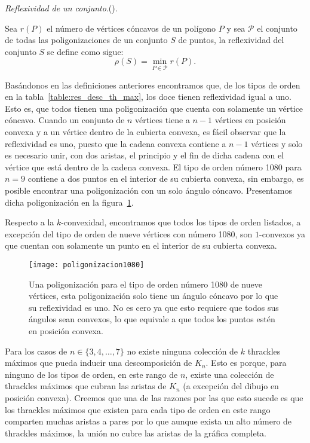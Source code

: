  \begin{definition}{\emph{Reflexividad de un conjunto}.(\cite{Arkin2003}).}

    Sea $r(P)$ el número de vértices cóncavos de un polígono $P$ y sea $\mathcal{P}$ el conjunto de todas las poligonizaciones de un conjunto $S$ de puntos, la reflexividad del conjunto $S$ se define como sigue: \[ \rho(S) = \min_{P\in \mathcal{P}} r(P).\]
  \end{definition}

  Basándonos en las definiciones anteriores encontramos que, de los tipos de orden en la
  tabla~\ref{table:res_desc_th_max}, los doce tienen reflexividad igual a uno. Esto es, que todos tienen una
  poligonización que cuenta con solamente un vértice cóncavo. Cuando un conjunto de $n$ vértices tiene a
  $n-1$ vértices en posición convexa y a un vértice dentro de la cubierta convexa, es fácil observar que la
  reflexividad es uno, puesto que la cadena convexa contiene a $n-1$ vértices y solo es necesario unir, con
  dos aristas, el principio y el fin de dicha cadena con el vértice que está dentro de la cadena convexa.
  El tipo de orden número 1080 para $n=9$ contiene a dos puntos en el interior de su cubierta convexa, sin
  embargo, es posible encontrar una poligonización con un solo ángulo cóncavo. Presentamos dicha
  poligonización en la figura~\ref{fig:poligonizacion1080}.

  Respecto a la $k$-convexidad, encontramos que todos los tipos de orden listados, a excepción del tipo de
  orden de nueve vértices con número 1080, son $1$-convexos ya que cuentan con solamente un punto en el
  interior de su cubierta convexa.

  \begin{figure}
    \centering
    \texttt{[image: poligonizacion1080]}
    \caption{Una poligonización para el tipo de orden número 1080 de nueve vértices, esta poligonización solo tiene un ángulo cóncavo por lo que su reflexividad es uno. No es cero ya que esto requiere que todos sus ángulos sean convexos, lo que equivale a que todos los puntos estén en posición convexa.}
    \label{fig:poligonizacion1080}
  \end{figure}

  Para los casos de $n \in \{3,4,\dots,7\}$ no existe ninguna
  colección de $k$ thrackles máximos que pueda inducir una descomposición de
  $K_n$. Esto es porque, para ninguno de los tipos de orden, en este rango de $n$,
  existe una colección de thrackles máximos que cubran las aristas de $K_n$ (a excepción del
  dibujo en posición convexa). Creemos que una de las razones por las que esto sucede es que los thrackles
  máximos que existen para cada tipo de orden en este rango comparten muchas aristas a pares por lo que
  aunque exista un alto número de thrackles máximos, la unión no cubre las aristas de la gráfica completa.

